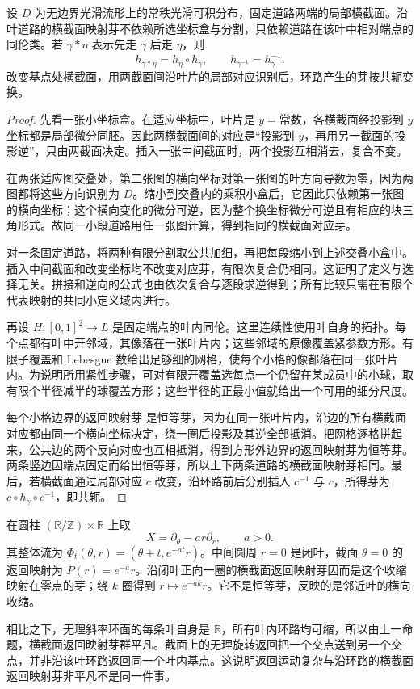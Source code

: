 \begin{proposition}
	\label{g1:prop:leaf-holonomy-homotopy}
	设 \(D\) 为无边界光滑流形上的常秩光滑可积分布，固定道路两端的局部横截面。沿叶道路的横截面映射芽不依赖所选坐标盒与分割，只依赖道路在该叶中相对端点的同伦类。若 \(\gamma*\eta\) 表示先走 \(\gamma\) 后走 \(\eta\)，则
	\[
		h_{\gamma*\eta}=h_\eta\circ h_\gamma,\qquad
		h_{\gamma^{-1}}=h_\gamma^{-1}.
	\]
	改变基点处横截面，用两截面间沿叶片的局部对应识别后，环路产生的芽按共轭变换。
\end{proposition}
\begin{proof}
	先看一张小坐标盒。在适应坐标中，叶片是 \(y=\text{常数}\)，各横截面经投影到 \(y\) 坐标都是局部微分同胚。因此两横截面间的对应是“投影到 \(y\)，再用另一截面的投影逆”，只由两截面决定。插入一张中间截面时，两个投影互相消去，复合不变。

	在两张适应图交叠处，第二张图的横向坐标对第一张图的叶方向导数为零，因为两图都将这些方向识别为 \(D\)。缩小到交叠内的乘积小盒后，它因此只依赖第一张图的横向坐标；这个横向变化的微分可逆，因为整个换坐标微分可逆且有相应的块三角形式。故同一小段道路用任一张图计算，得到相同的横截面对应芽。

	对一条固定道路，将两种有限分割取公共加细，再把每段缩小到上述交叠小盒中。插入中间截面和改变坐标均不改变对应芽，有限次复合仍相同。这证明了定义与选择无关。拼接和逆向的公式也由依次复合与逐段求逆得到；所有比较只需在有限个代表映射的共同小定义域内进行。

	再设 \(H:[0,1]^2\to L\) 是固定端点的叶内同伦。这里连续性使用叶自身的拓扑。每个点都有叶中开邻域，其像落在一张叶片内；这些邻域的原像覆盖紧参数方形。有限子覆盖和 Lebesgue 数给出足够细的网格，使每个小格的像都落在同一张叶片内。为说明所用紧性步骤，可对有限开覆盖选每点一个仍留在某成员中的小球，取有限个半径减半的球覆盖方形；这些半径的正最小值就给出一个可用的细分尺度。

	每个小格边界的返回映射芽 是恒等芽，因为在同一张叶片内，沿边的所有横截面对应都由同一个横向坐标决定，绕一圈后投影及其逆全部抵消。把网格逐格拼起来，公共边的两个反向对应也互相抵消，得到方形外边界的返回映射芽为恒等芽。两条竖边因端点固定而给出恒等芽，所以上下两条道路的横截面映射芽相同。最后，若横截面通过局部对应 \(c\) 改变，沿环路前后分别插入 \(c^{-1}\) 与 \(c\)，所得芽为 \(c\circ h_\gamma\circ c^{-1}\)，即共轭。
\end{proof}

\begin{example}
	\label{g1:exm:contracting-leaf-holonomy}
	在圆柱 \((\mathbb R/\mathbb Z)\times\mathbb R\) 上取
	\[
		X=\partial_\theta-a r\partial_r,\qquad a>0.
	\]
	其整体流为 \(\Phi_t(\theta,r)=(\theta+t,e^{-at}r)\)。中间圆周 \(r=0\) 是闭叶，截面 \(\theta=0\) 的返回映射为 \(P(r)=e^{-a}r\)。沿闭叶正向一圈的横截面返回映射芽因而是这个收缩映射在零点的芽；绕 \(k\) 圈得到 \(r\mapsto e^{-ak}r\)。它不是恒等芽，反映的是邻近叶的横向收缩。

	相比之下，无理斜率环面的每条叶自身是 \(\mathbb R\)，所有叶内环路均可缩，所以由上一命题，横截面返回映射芽群平凡。截面上的无理旋转返回把一个交点送到另一个交点，并非沿该叶环路返回同一个叶内基点。这说明返回运动复杂与沿环路的横截面返回映射芽非平凡不是同一件事。
\end{example}

